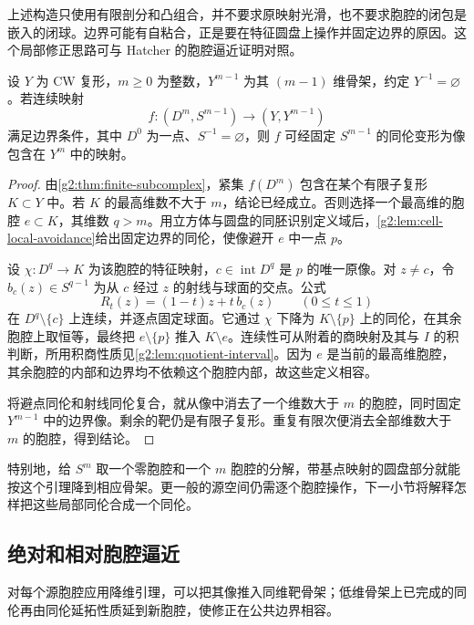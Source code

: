 上述构造只使用有限剖分和凸组合，并不要求原映射光滑，也不要求胞腔的闭包是嵌入的闭球。边界可能有自粘合，正是要在特征圆盘上操作并固定边界的原因。这个局部修正思路可与 Hatcher 的胞腔逼近证明对照\cite[第4.1节]{Hatcher2002}。

\begin{lemma}\label{g2:lem:disk-dimension-lowering}
	设 \(Y\) 为 CW 复形，\(m\ge0\) 为整数，\(Y^{m-1}\) 为其 \((m-1)\) 维骨架，约定 \(Y^{-1}=\varnothing\)。若连续映射
	\[
		f:(D^m,S^{m-1})\longrightarrow(Y,Y^{m-1})
	\]
	满足边界条件，其中 \(D^0\) 为一点、\(S^{-1}=\varnothing\)，则 \(f\) 可经固定 \(S^{m-1}\) 的同伦变形为像包含在 \(Y^m\) 中的映射。
\end{lemma}
\begin{proof}
	由\cref{g2:thm:finite-subcomplex}，紧集 \(f(D^m)\) 包含在某个有限子复形 \(K\subset Y\) 中。若 \(K\) 的最高维数不大于 \(m\)，结论已经成立。否则选择一个最高维的胞腔 \(e\subset K\)，其维数 \(q>m\)。用立方体与圆盘的同胚识别定义域后，\cref{g2:lem:cell-local-avoidance}给出固定边界的同伦，使像避开 \(e\) 中一点 \(p\)。

	设 \(\chi:D^q\to K\) 为该胞腔的特征映射，\(c\in\operatorname{int}D^q\) 是 \(p\) 的唯一原像。对 \(z\ne c\)，令 \(b_c(z)\in S^{q-1}\) 为从 \(c\) 经过 \(z\) 的射线与球面的交点。公式
	\[
		R_t(z)=(1-t)z+t\,b_c(z)
		\qquad(0\le t\le1)
	\]
	在 \(D^q\setminus\{c\}\) 上连续，并逐点固定球面。它通过 \(\chi\) 下降为 \(K\setminus\{p\}\) 上的同伦，在其余胞腔上取恒等，最终把 \(e\setminus\{p\}\) 推入 \(K\setminus e\)。连续性可从附着的商映射及其与 \(I\) 的积判断，所用积商性质见\cref{g2:lem:quotient-interval}。因为 \(e\) 是当前的最高维胞腔，其余胞腔的内部和边界均不依赖这个胞腔内部，故这些定义相容。

	将避点同伦和射线同伦复合，就从像中消去了一个维数大于 \(m\) 的胞腔，同时固定 \(Y^{m-1}\) 中的边界像。剩余的靶仍是有限子复形。重复有限次便消去全部维数大于 \(m\) 的胞腔，得到结论。
\end{proof}

特别地，给 \(S^m\) 取一个零胞腔和一个 \(m\) 胞腔的分解，带基点映射的圆盘部分就能按这个引理降到相应骨架。更一般的源空间仍需逐个胞腔操作，下一小节将解释怎样把这些局部同伦合成一个同伦。

\subsection{绝对和相对胞腔逼近}
\label{g2:subsec:0104:02}

对每个源胞腔应用降维引理，可以把其像推入同维靶骨架；低维骨架上已完成的同伦再由同伦延拓性质延到新胞腔，使修正在公共边界相容。

